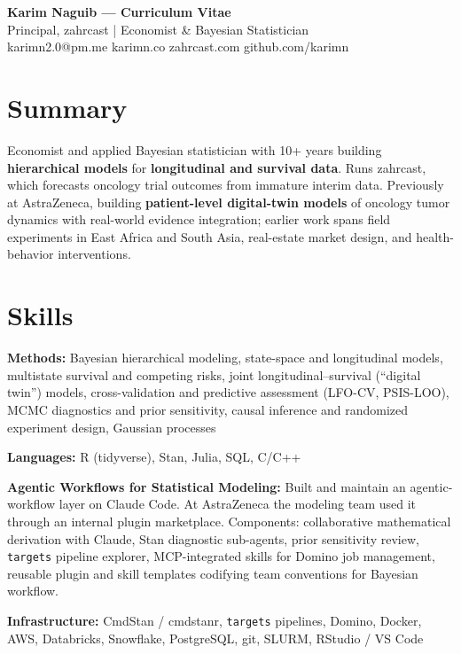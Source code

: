 \documentclass[11pt]{article}
\begin{document}
\begin{center}
{\Large \textbf{Karim Naguib --- Curriculum Vitae}}\\[2mm]
Principal, zahrcast | Economist \& Bayesian Statistician\\[1mm]
karimn2.0@pm.me \quad karimn.co \quad zahrcast.com \quad github.com/karimn
\end{center}

\vspace{4mm}

\section*{Summary}

Economist and applied Bayesian statistician with 10+ years building \textbf{hierarchical models} for \textbf{longitudinal and survival data}. Runs zahrcast, which forecasts oncology trial outcomes from immature interim data. Previously at AstraZeneca, building \textbf{patient-level digital-twin models} of oncology tumor dynamics with real-world evidence integration; earlier work spans field experiments in East Africa and South Asia, real-estate market design, and health-behavior interventions.

\section*{Skills}

\textbf{Methods:} Bayesian hierarchical modeling, state-space and longitudinal models, multistate survival and competing risks, joint longitudinal--survival (``digital twin'') models, cross-validation and predictive assessment (LFO-CV, PSIS-LOO), MCMC diagnostics and prior sensitivity, causal inference and randomized experiment design, Gaussian processes

\textbf{Languages:} R (tidyverse), Stan, Julia, SQL, C/C++

\textbf{Agentic Workflows for Statistical Modeling:} Built and maintain an agentic-workflow layer on Claude Code. At AstraZeneca the modeling team used it through an internal plugin marketplace. Components: collaborative mathematical derivation with Claude, Stan diagnostic sub-agents, prior sensitivity review, \texttt{targets} pipeline explorer, MCP-integrated skills for Domino job management, reusable plugin and skill templates codifying team conventions for Bayesian workflow.

\textbf{Infrastructure:} CmdStan / cmdstanr, \texttt{targets} pipelines, Domino, Docker, AWS, Databricks, Snowflake, PostgreSQL, git, SLURM, RStudio / VS Code
\end{document}
